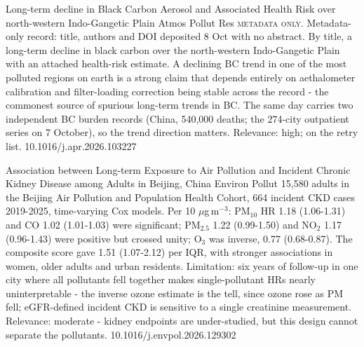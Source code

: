 \documentclass[10pt]{article}
\begin{document}
{Long-term decline in Black Carbon Aerosol and Associated Health Risk over north-western Indo-Gangetic Plain}
{Atmos Pollut Res}
{\textsc{metadata only.} Metadata-only record: title, authors and DOI deposited 8 Oct with no abstract. By title, a long-term decline in black carbon over the north-western Indo-Gangetic Plain with an attached health-risk estimate. A declining BC trend in one of the most polluted regions on earth is a strong claim that depends entirely on aethalometer calibration and filter-loading correction being stable across the record - the commonest source of spurious long-term trends in BC. The same day carries two independent BC burden records (China, 540,000 deaths; the 274-city outpatient series on 7 October), so the trend direction matters. Relevance: high; on the retry list.}
{10.1016/j.apr.2026.103227}

\par{}\baselineskip{}\baselineskip
{}

{Association between Long-term Exposure to Air Pollution and Incident Chronic Kidney Disease among Adults in Beijing, China}
{Environ Pollut}
{15,580 adults in the Beijing Air Pollution and Population Health Cohort, 664 incident CKD cases 2019-2025, time-varying Cox models. Per 10 $\mu$g\,m$^{-3}$: PM$_{10}$ HR 1.18 (1.06-1.31) and CO 1.02 (1.01-1.03) were significant; PM$_{2.5}$ 1.22 (0.99-1.50) and NO$_2$ 1.17 (0.96-1.43) were positive but crossed unity; O$_3$ was inverse, 0.77 (0.68-0.87). The composite score gave 1.51 (1.07-2.12) per IQR, with stronger associations in women, older adults and urban residents. Limitation: six years of follow-up in one city where all pollutants fell together makes single-pollutant HRs nearly uninterpretable - the inverse ozone estimate is the tell, since ozone rose as PM fell; eGFR-defined incident CKD is sensitive to a single creatinine measurement. Relevance: moderate - kidney endpoints are under-studied, but this design cannot separate the pollutants.}
{10.1016/j.envpol.2026.129302}
\end{document}
